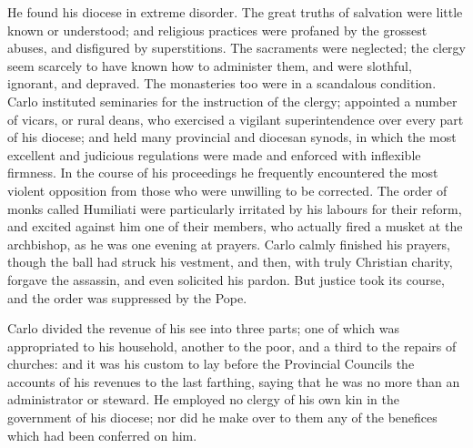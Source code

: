 He found his diocese in extreme disorder. The great truths of
salvation were little known or understood; and religious practices
were profaned by the grossest abuses, and disfigured by superstitions.
The sacraments were neglected; the clergy seem scarcely to have known
how to administer them, and were slothful, ignorant, and depraved. The
monasteries too were in a scandalous condition. Carlo instituted
seminaries for the instruction of the clergy; appointed a number of
vicars, or rural deans, who exercised a vigilant superintendence over
every part of his diocese; and held many provincial and diocesan
synods, in which the most excellent and judicious regulations were
made and enforced with inflexible firmness. In the course of his
proceedings he frequently encountered the most violent opposition from
those who were unwilling to be corrected. The order of monks called
Humiliati were particularly irritated by his labours for their reform,
and excited against him one of their members, who actually fired a
musket at the archbishop, as he was one evening at prayers. Carlo
calmly finished his prayers, though the ball had struck his vestment,
and then, with truly Christian charity, forgave the assassin,
and even solicited his pardon. But justice took its course, and the
order was suppressed by the Pope.

Carlo divided the revenue of his see into three parts; one of which
was appropriated to his household, another to the poor, and a third to
the repairs of churches: and it was his custom to lay before the
Provincial Councils the accounts of his revenues to the last farthing,
saying that he was no more than an administrator or steward. He
employed no clergy of his own kin in the government of his diocese;
nor did he make over to them any of the benefices which had been
conferred on him.

